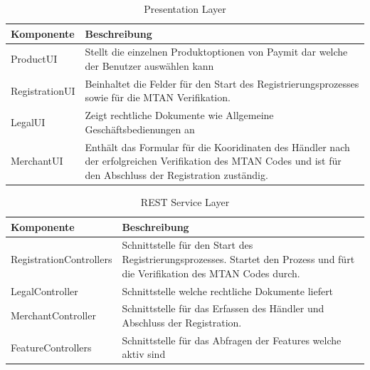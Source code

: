 \begin{table}[H]
	\centering
	\caption{Presentation Layer}
	\begin{tabular}{ | p{4cm} | p{11cm} | }
		\toprule
		{\textbf{Komponente}} & {\textbf{Beschreibung}} \\
		\midrule
		ProductUI &  Stellt die einzelnen Produktoptionen von Paymit dar welche der Benutzer auswählen kann\\ \hline
		RegistrationUI  &  Beinhaltet die Felder für den Start des Registrierungsprozesses sowie für die MTAN Verifikation.\\ \hline
		LegalUI &  Zeigt rechtliche Dokumente wie Allgemeine Geschäftsbedienungen an \\ \hline
		MerchantUI & Enthält das Formular für die Kooridinaten des Händler nach der erfolgreichen Verifikation des MTAN Codes und ist für den Abschluss der Registration zuständig.\\
		\bottomrule
	\end{tabular}
\end{table}

\begin{table}[H]
	\centering
	\caption{REST Service Layer}
	\begin{tabular}{ | p{4cm} | p{11cm} | }
		\toprule
		{\textbf{Komponente}} & {\textbf{Beschreibung}} \\
		\midrule
		RegistrationControllers &  Schnittstelle für den Start des Registrierungsprozesses. Startet den Prozess und fürt die Verifikation des MTAN Codes durch.\\ \hline
		LegalController &  Schnittstelle welche rechtliche Dokumente liefert \\ \hline
		MerchantController &  Schnittstelle für das Erfassen des Händler und Abschluss der Registration. \\ \hline
		FeatureControllers & Schnittstelle für das Abfragen der Features welche aktiv sind \\
		\bottomrule
	\end{tabular}
\end{table}

